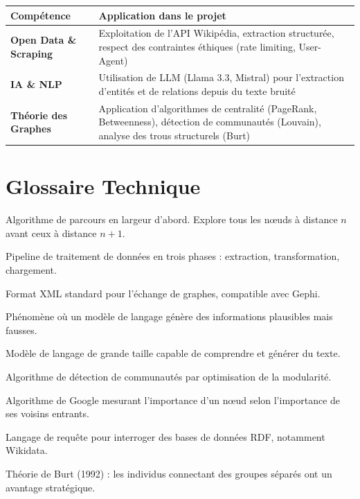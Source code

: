\documentclass[12pt,a4paper]{report}
\begin{document}
\begin{table}[H]
\centering
\begin{tabular}{|p{4cm}|p{10cm}|}
\hline
\rowcolor{ice500!20}
\textbf{Compétence} & \textbf{Application dans le projet} \\
\hline
\textbf{Open Data \& Scraping} & Exploitation de l'API Wikipédia, extraction structurée, respect des contraintes éthiques (rate limiting, User-Agent) \\
\hline
\textbf{IA \& NLP} & Utilisation de LLM (Llama 3.3, Mistral) pour l'extraction d'entités et de relations depuis du texte bruité \\
\hline
\textbf{Théorie des Graphes} & Application d'algorithmes de centralité (PageRank, Betweenness), détection de communautés (Louvain), analyse des trous structurels (Burt) \\
\hline
\end{tabular}
\end{table}

\section{Glossaire Technique}

\begin{description}[style=nextline, leftmargin=3cm]
    \item[BFS (Breadth-First Search)] Algorithme de parcours en largeur d'abord. Explore tous les nœuds à distance $n$ avant ceux à distance $n+1$.
    \item[ETL (Extract, Transform, Load)] Pipeline de traitement de données en trois phases : extraction, transformation, chargement.
    \item[GEXF] Format XML standard pour l'échange de graphes, compatible avec Gephi.
    \item[Hallucination (LLM)] Phénomène où un modèle de langage génère des informations plausibles mais fausses.
    \item[LLM (Large Language Model)] Modèle de langage de grande taille capable de comprendre et générer du texte.
    \item[Louvain] Algorithme de détection de communautés par optimisation de la modularité.
    \item[PageRank] Algorithme de Google mesurant l'importance d'un nœud selon l'importance de ses voisins entrants.
    \item[SPARQL] Langage de requête pour interroger des bases de données RDF, notamment Wikidata.
    \item[Structural Holes] Théorie de Burt (1992) : les individus connectant des groupes séparés ont un avantage stratégique.
\end{description}
\end{document}
